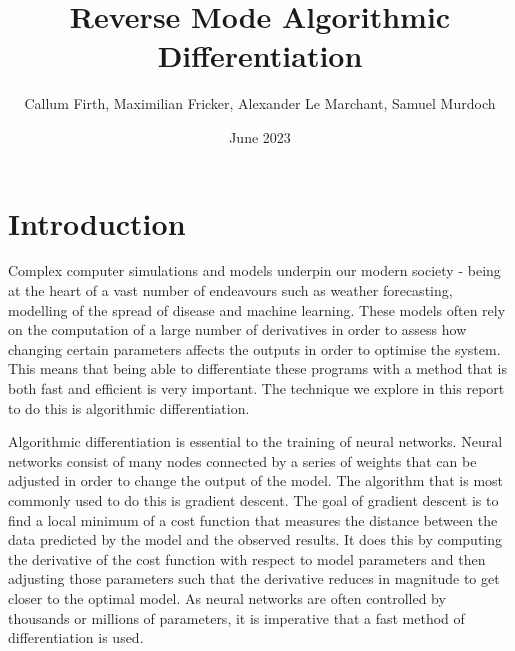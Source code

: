 \documentclass{article}
\title{Reverse Mode Algorithmic Differentiation}
\author{Callum Firth, Maximilian Fricker, Alexander Le Marchant, Samuel Murdoch} %
\date{June 2023}
\begin{document}
\maketitle

\tableofcontents


\section{Introduction}

Complex computer simulations and models underpin our modern society - being at the heart of a vast number of endeavours such as weather forecasting, modelling of the spread of disease and machine learning. These models often rely on the computation of a large number of derivatives in order to assess how changing certain parameters affects the outputs in order to optimise the system. This means that being able to differentiate these programs with a method that is both fast and efficient is very important. The technique we explore in this report to do this is algorithmic differentiation.

Algorithmic differentiation is essential to the training of neural networks. Neural networks consist of many nodes connected by a series of weights that can be adjusted in order to change the output of the model. The algorithm that is most commonly used to do this is gradient descent. The goal of gradient descent is to find a local minimum of a cost function that measures the distance between the data predicted by the model and the observed results. It does this by computing the derivative of the cost function with respect to model parameters and then adjusting those parameters such that the derivative reduces in magnitude to get closer to the optimal model. As neural networks are often controlled by thousands or millions of parameters, it is imperative that a fast method of differentiation is used.
\end{document}
